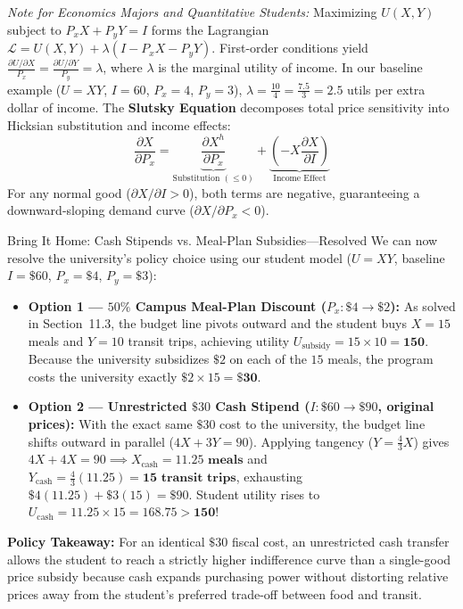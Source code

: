 \documentclass[11pt,letterpaper]{article}
\begin{document}
\begin{tcolorbox}[colback=LightSlate,colframe=CourseBlue,title=\textbf{Optional Advanced Section: Lagrangian Optimization and the Slutsky Equation}]
\small
\emph{Note for Economics Majors and Quantitative Students:}
Maximizing $U(X, Y)$ subject to $P_x X + P_y Y = I$ forms the Lagrangian $\mathcal{L} = U(X, Y) + \lambda(I - P_x X - P_y Y)$. First-order conditions yield $\frac{\partial U / \partial X}{P_x} = \frac{\partial U / \partial Y}{P_y} = \lambda$, where $\lambda$ is the marginal utility of income. In our baseline example ($U = XY$, $I = 60$, $P_x = 4$, $P_y = 3$), $\lambda = \frac{10}{4} = \frac{7.5}{3} = 2.5$ utils per extra dollar of income. The \textbf{Slutsky Equation} decomposes total price sensitivity into Hicksian substitution and income effects:
\[
\frac{\partial X}{\partial P_x} = \underbrace{\frac{\partial X^h}{\partial P_x}}_{\text{Substitution } (\le 0)} + \underbrace{\left(-X \frac{\partial X}{\partial I}\right)}_{\text{Income Effect}}
\]
For any normal good ($\partial X / \partial I > 0$), both terms are negative, guaranteeing a downward-sloping demand curve ($\partial X / \partial P_x < 0$).
\end{tcolorbox}

\begin{examplecase}{Bring It Home: Cash Stipends vs. Meal-Plan Subsidies—Resolved}
We can now resolve the university's policy choice using our student model ($U = XY$, baseline $I = \$60$, $P_x = \$4$, $P_y = \$3$):
\begin{itemize}
    \item \textbf{Option 1 — $50\%$ Campus Meal-Plan Discount ($P_x: \$4 \to \$2$):} As solved in Section~11.3, the budget line pivots outward and the student buys $X = 15$ meals and $Y = 10$ transit trips, achieving utility $U_{\text{subsidy}} = 15 \times 10 = \mathbf{150}$. Because the university subsidizes $\$2$ on each of the $15$ meals, the program costs the university exactly $\$2 \times 15 = \mathbf{\$30}$.
    \item \textbf{Option 2 — Unrestricted $\$30$ Cash Stipend ($I: \$60 \to \$90$, original prices):} With the exact same $\$30$ cost to the university, the budget line shifts outward in parallel ($4X + 3Y = 90$). Applying tangency ($Y = \frac{4}{3}X$) gives $4X + 4X = 90 \implies X_{\text{cash}} = \mathbf{11.25\text{ meals}}$ and $Y_{\text{cash}} = \frac{4}{3}(11.25) = \mathbf{15\text{ transit trips}}$, exhausting $\$4(11.25) + \$3(15) = \$90$. Student utility rises to $U_{\text{cash}} = 11.25 \times 15 = \mathbf{168.75 > 150}$!
\end{itemize}
\textbf{Policy Takeaway:} For an identical $\$30$ fiscal cost, an unrestricted cash transfer allows the student to reach a strictly higher indifference curve than a single-good price subsidy because cash expands purchasing power without distorting relative prices away from the student's preferred trade-off between food and transit.
\end{examplecase}
\end{document}
